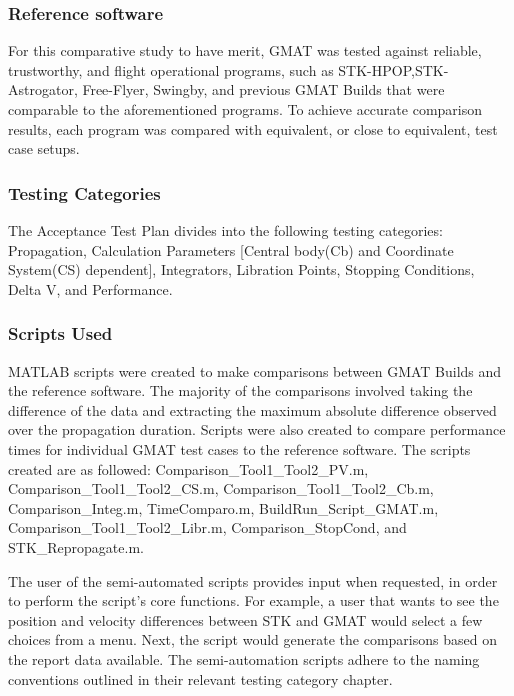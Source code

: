\subsubsection{Reference software}
For this comparative study to have merit, GMAT was tested against
reliable, trustworthy, and flight operational programs, such as
STK-HPOP,STK-Astrogator,
Free-Flyer, Swingby, and previous
GMAT Builds that were comparable to the aforementioned programs. To
achieve accurate comparison results, each program was compared with
equivalent, or close to equivalent, test case setups.

\subsubsection{Testing Categories}
The Acceptance Test Plan divides into the following testing
categories: Propagation, Calculation Parameters
[Central body(Cb) and Coordinate System(CS)
dependent], Integrators, Libration
Points, Stopping Conditions, Delta V, and
Performance.

\subsubsection{Scripts Used}
MATLAB scripts were created to make comparisons
between GMAT Builds and the reference software. The majority of the
comparisons involved taking the difference of the data and
extracting the maximum absolute difference observed over the
propagation duration. Scripts were also created to compare
performance times for individual GMAT test cases to the reference
software. The scripts created are as followed:
Comparison\_Tool1\_Tool2\_PV.m, Comparison\_Tool1\_Tool2\_CS.m,
Comparison\_Tool1\_Tool2\_Cb.m, Comparison\_Integ.m, TimeComparo.m,
BuildRun\_Script\_GMAT.m,
Comparison\_Tool1\_Tool2\_Libr.m, Comparison\_StopCond, and \\
STK\_Repropagate.m.

The user of the semi-automated scripts provides input when
requested, in order to perform the script's core functions. For
example, a user that wants to see the position and velocity
differences between STK and GMAT would select a few
choices from a menu. Next, the script would generate the comparisons
based on the report data available. The semi-automation scripts
adhere to the naming conventions outlined in their relevant testing
category chapter.

